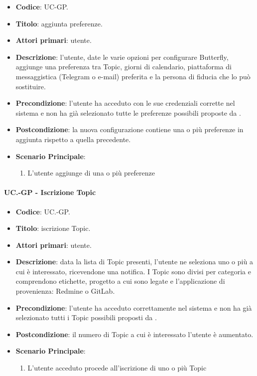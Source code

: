 	\begin{itemize}
		\item \textbf{Codice}: UC\theuccount-GP.
		\item \textbf{Titolo}: aggiunta preferenze.
		\item \textbf{Attori primari}: utente.
		\item \textbf{Descrizione}: l’utente, date le varie opzioni per configurare Butterfly, aggiunge una
		preferenza tra Topic, giorni di calendario, piattaforma di messaggistica (Telegram o e-mail)	preferita e la persona di fiducia che lo può sostituire.
		\item \textbf{Precondizione}: l’utente ha acceduto con le sue credenziali corrette nel sistema e non ha già selezionato tutte le preferenze possibili proposte da \progetto.
		\item \textbf{Postcondizione}: la nuova configurazione contiene una o più preferenze in aggiunta rispetto a quella precedente.
		\item \textbf{Scenario Principale}:
		\begin{enumerate}
			\item L'utente aggiunge di una o più preferenze
		\end{enumerate}
	\end{itemize}

	\paragraph{UC\theuccount.\thesubuccount-GP - Iscrizione Topic}
		
		\begin{itemize}
			\item \textbf{Codice}: UC\theuccount.\thesubuccount-GP.
			\item \textbf{Titolo}: iscrizione Topic.
			\item \textbf{Attori primari}: utente.
			\item \textbf{Descrizione}: data la lista di Topic presenti, l’utente ne seleziona uno o	più a cui è interessato, ricevendone una notifica. I Topic sono divisi per categoria e	comprendono etichette, progetto a cui sono legate e l'applicazione di provenienza: Redmine o GitLab.
			\item \textbf{Precondizione}: l’utente ha acceduto correttamente nel sistema e non ha già selezionato tutti i Topic possibili proposti da \progetto.
			\item \textbf{Postcondizione}: il numero di Topic a cui è interessato l’utente è aumentato.
			\item \textbf{Scenario Principale}:
			\begin{enumerate}
				\item L'utente acceduto procede all'iscrizione di uno o più Topic
			\end{enumerate}
		\end{itemize}
	
